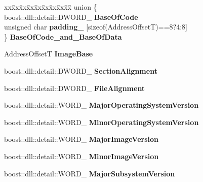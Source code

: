 \begin{DoxyCompactItemize}
\item 
\begin{tabbing}
xx\=xx\=xx\=xx\=xx\=xx\=xx\=xx\=xx\=\kill
union \{\\
\>boost::dll::detail::DWORD\_ {\bfseries BaseOfCode}\\
\>unsigned char {\bfseries padding\_} \mbox{[}sizeof(AddressOffsetT)==8?4:8\mbox{]}\\
\} {\bfseries BaseOfCode\_and\_BaseOfData}\hypertarget{a00149_a10b0fad982495fcb899f80f6a96802e8}{}\label{a00149_a10b0fad982495fcb899f80f6a96802e8}
\\

\end{tabbing}\item 
Address\+OffsetT {\bfseries Image\+Base}\hypertarget{a00149_aaa98c9194f6cfdc737ea18c5047df18a}{}\label{a00149_aaa98c9194f6cfdc737ea18c5047df18a}

\item 
boost\+::dll\+::detail\+::\+D\+W\+O\+R\+D\+\_\+ {\bfseries Section\+Alignment}\hypertarget{a00149_a95afdf2ff8a21293d7baad2931e92c15}{}\label{a00149_a95afdf2ff8a21293d7baad2931e92c15}

\item 
boost\+::dll\+::detail\+::\+D\+W\+O\+R\+D\+\_\+ {\bfseries File\+Alignment}\hypertarget{a00149_a21fce43504dc1eb8437cf5bd8e04a288}{}\label{a00149_a21fce43504dc1eb8437cf5bd8e04a288}

\item 
boost\+::dll\+::detail\+::\+W\+O\+R\+D\+\_\+ {\bfseries Major\+Operating\+System\+Version}\hypertarget{a00149_a846d83f8a021d3746748d3f6b23a8e45}{}\label{a00149_a846d83f8a021d3746748d3f6b23a8e45}

\item 
boost\+::dll\+::detail\+::\+W\+O\+R\+D\+\_\+ {\bfseries Minor\+Operating\+System\+Version}\hypertarget{a00149_a8a1a7bbb7b06ac2120cfdc09463cd1a7}{}\label{a00149_a8a1a7bbb7b06ac2120cfdc09463cd1a7}

\item 
boost\+::dll\+::detail\+::\+W\+O\+R\+D\+\_\+ {\bfseries Major\+Image\+Version}\hypertarget{a00149_aa237f87b050f32f576c88cb8d2400584}{}\label{a00149_aa237f87b050f32f576c88cb8d2400584}

\item 
boost\+::dll\+::detail\+::\+W\+O\+R\+D\+\_\+ {\bfseries Minor\+Image\+Version}\hypertarget{a00149_a01dd0be3073b05ec638603a048e6f81d}{}\label{a00149_a01dd0be3073b05ec638603a048e6f81d}

\item 
boost\+::dll\+::detail\+::\+W\+O\+R\+D\+\_\+ {\bfseries Major\+Subsystem\+Version}\hypertarget{a00149_a6798cbb9208df874e7a93ae809a46ca1}{}\label{a00149_a6798cbb9208df874e7a93ae809a46ca1}


\end{DoxyCompactItemize}
